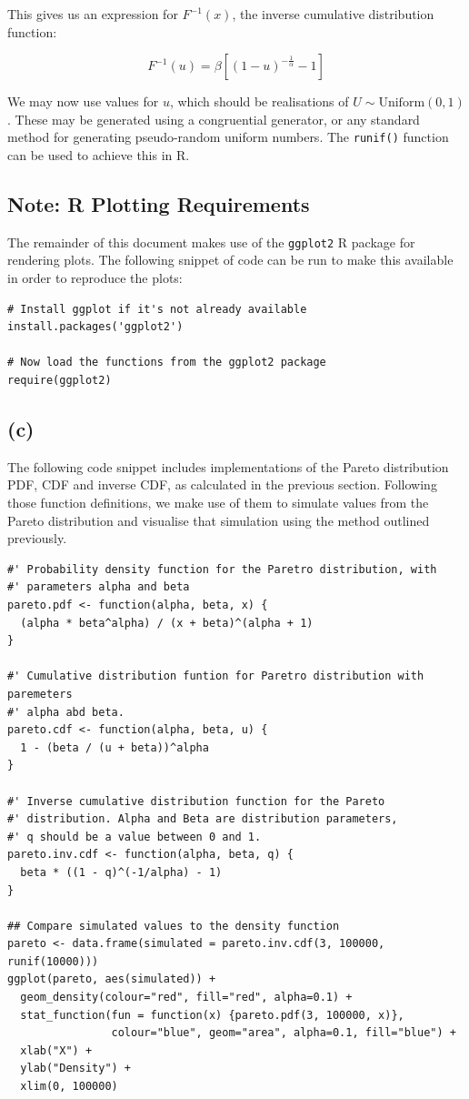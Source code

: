 \documentclass{article}
\begin{document}
This gives us an expression for $F^{-1}(x)$, the inverse cumulative
distribution function:

\[
  F^{-1}(u) = \beta \left[{ \left( 1 - u \right)}^{-\frac{1}{\alpha}}
    - 1 \right]
\]

We may now use values for $u$, which should be realisations of  $U
\sim \mathrm{Uniform}(0, 1)$. These may be generated using a
congruential generator, or any standard method for generating
pseudo-random uniform numbers. The \texttt{runif()} function can be
used to achieve this in R.

\subsection*{Note: R Plotting Requirements}

The remainder of this document makes use of the \texttt{ggplot2} R
package for rendering plots. The following snippet of code can be run
to make this available in order to reproduce the plots:

\begin{verbatim}
# Install ggplot if it's not already available
install.packages('ggplot2')

# Now load the functions from the ggplot2 package
require(ggplot2)
\end{verbatim}

\subsection*{(c)}

The following code snippet includes implementations of the Pareto
distribution PDF, CDF and inverse CDF, as calculated in the previous
section. Following those function definitions, we make use of them to
simulate values from the Pareto distribution and visualise that
simulation using the method outlined previously.

\begin{verbatim}
#' Probability density function for the Paretro distribution, with
#' parameters alpha and beta
pareto.pdf <- function(alpha, beta, x) {
  (alpha * beta^alpha) / (x + beta)^(alpha + 1)
}

#' Cumulative distribution funtion for Paretro distribution with paremeters
#' alpha abd beta.
pareto.cdf <- function(alpha, beta, u) {
  1 - (beta / (u + beta))^alpha
}

#' Inverse cumulative distribution function for the Pareto
#' distribution. Alpha and Beta are distribution parameters,
#' q should be a value between 0 and 1.
pareto.inv.cdf <- function(alpha, beta, q) {
  beta * ((1 - q)^(-1/alpha) - 1)
}

## Compare simulated values to the density function
pareto <- data.frame(simulated = pareto.inv.cdf(3, 100000, runif(10000)))
ggplot(pareto, aes(simulated)) +
  geom_density(colour="red", fill="red", alpha=0.1) +
  stat_function(fun = function(x) {pareto.pdf(3, 100000, x)},
                colour="blue", geom="area", alpha=0.1, fill="blue") +
  xlab("X") +
  ylab("Density") +
  xlim(0, 100000)
\end{verbatim}
\end{document}
